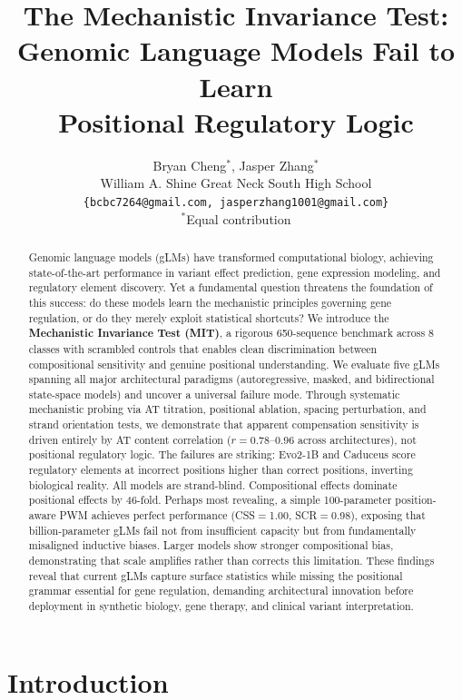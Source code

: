 \documentclass{article}
\title{The Mechanistic Invariance Test: \\ Genomic Language Models Fail to Learn \\ Positional Regulatory Logic}
\author{Bryan Cheng$^{*}$, Jasper Zhang$^{*}$ \\
William A. Shine Great Neck South High School \\
\texttt{\{bcbc7264@gmail.com, jasperzhang1001@gmail.com\}} \\
$^{*}$Equal contribution
}
\begin{document}
\maketitle
{}

\begin{abstract}
Genomic language models (gLMs) have transformed computational biology, achieving state-of-the-art performance in variant effect prediction, gene expression modeling, and regulatory element discovery. Yet a fundamental question threatens the foundation of this success: do these models learn the mechanistic principles governing gene regulation, or do they merely exploit statistical shortcuts? We introduce the \textbf{Mechanistic Invariance Test (MIT)}, a rigorous 650-sequence benchmark across 8 classes with scrambled controls that enables clean discrimination between compositional sensitivity and genuine positional understanding. We evaluate five gLMs spanning all major architectural paradigms (autoregressive, masked, and bidirectional state-space models) and uncover a universal failure mode. Through systematic mechanistic probing via AT titration, positional ablation, spacing perturbation, and strand orientation tests, we demonstrate that apparent compensation sensitivity is driven entirely by AT content correlation ($r$$=$0.78--0.96 across architectures), not positional regulatory logic. The failures are striking: Evo2-1B and Caduceus score regulatory elements at incorrect positions higher than correct positions, inverting biological reality. All models are strand-blind. Compositional effects dominate positional effects by 46-fold. Perhaps most revealing, a simple 100-parameter position-aware PWM achieves perfect performance (CSS$=$1.00, SCR$=$0.98), exposing that billion-parameter gLMs fail not from insufficient capacity but from fundamentally misaligned inductive biases. Larger models show stronger compositional bias, demonstrating that scale amplifies rather than corrects this limitation. These findings reveal that current gLMs capture surface statistics while missing the positional grammar essential for gene regulation, demanding architectural innovation before deployment in synthetic biology, gene therapy, and clinical variant interpretation.
\end{abstract}

\section{Introduction}
\end{document}
